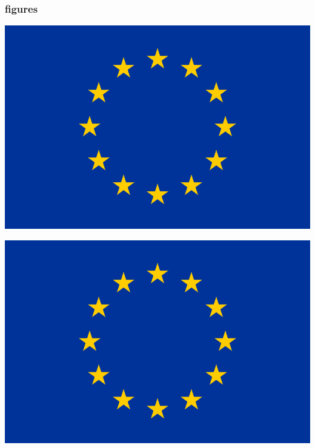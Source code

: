 \documentclass{beamer}
\begin{document}
% 
\begin{frame}
  \begin{adjustwidth}{-1em}{-1em}
    \frametitle{figures}
    \begin{minipage}[]{0.5\textwidth}
      \includegraphics[width=\textwidth]{Flag_of_Europe.png}
    \end{minipage}\hfill
    \begin{minipage}[]{0.5\textwidth}
      \includegraphics[width=\textwidth]{Flag_of_Europe.png}
    \end{minipage}
  \end{adjustwidth}
\end{frame}
\end{document}
